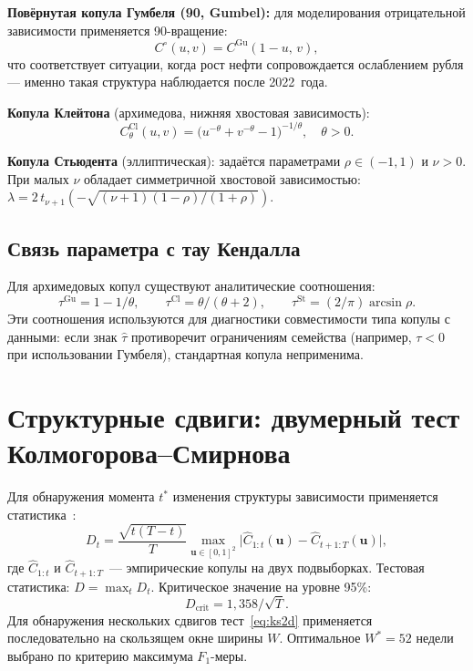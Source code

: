 \textbf{Повёрнутая копула Гумбеля (90\textdegree, Gumbel\textdegree):}
для моделирования отрицательной зависимости применяется 90\textdegree-вращение:
\begin{equation}
  C^{\circ}(u,v) = C^{\mathrm{Gu}}(1-u,\, v),
\end{equation}
что соответствует ситуации, когда рост нефти сопровождается ослаблением рубля
--- именно такая структура наблюдается после 2022~года.

\textbf{Копула Клейтона} (архимедова, нижняя хвостовая зависимость):
\begin{equation}
  C_\theta^{\mathrm{Cl}}(u,v) =
  \bigl(u^{-\theta} + v^{-\theta} - 1\bigr)^{-1/\theta},
  \quad \theta > 0.
\end{equation}

\textbf{Копула Стьюдента} (эллиптическая):
задаётся параметрами $\rho \in (-1,1)$ и $\nu > 0$.
При малых $\nu$ обладает симметричной хвостовой зависимостью:
$\lambda = 2\,t_{\nu+1}\!\left(-\sqrt{(\nu+1)(1-\rho)/(1+\rho)}\right)$.

\subsection{Связь параметра с тау Кендалла}

Для архимедовых копул существуют аналитические соотношения:
\begin{equation}
  \tau^{\mathrm{Gu}} = 1 - 1/\theta, \qquad
  \tau^{\mathrm{Cl}} = \theta/(\theta+2), \qquad
  \tau^{\mathrm{St}} = (2/\pi)\arcsin\rho.
\end{equation}
Эти соотношения используются для диагностики совместимости типа копулы с данными:
если знак $\hat\tau$ противоречит ограничениям семейства (например, $\tau < 0$
при использовании Гумбеля), стандартная копула неприменима.


\section{Структурные сдвиги: двумерный тест Колмогорова--Смирнова}

Для обнаружения момента $t^*$ изменения структуры зависимости
применяется статистика~\autocite{GenestNeslehovaQuessy2012}:
\begin{equation}
  D_t = \frac{\sqrt{t(T-t)}}{T}
        \max_{\mathbf{u}\in[0,1]^2}
        \bigl|\hat{C}_{1:t}(\mathbf{u}) - \hat{C}_{t+1:T}(\mathbf{u})\bigr|,
  \label{eq:ks2d}
\end{equation}
где $\hat{C}_{1:t}$ и $\hat{C}_{t+1:T}$~--- эмпирические копулы на двух
подвыборках.
Тестовая статистика: $D = \max_t D_t$.
Критическое значение на уровне 95\%:
\begin{equation}
  D_{\mathrm{crit}} = 1{,}358 / \sqrt{T}.
  \label{eq:kscrit}
\end{equation}
Для обнаружения нескольких сдвигов тест~\eqref{eq:ks2d} применяется
последовательно на скользящем окне ширины $W$.
Оптимальное $W^* = 52$ недели выбрано по критерию максимума $F_1$-меры.


